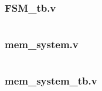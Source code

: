 \subsubsection*{FSM\_tb.v}
\inputminted{verilog}{../verilog_mem8x8_m_tri_state_buffer/FSM_tb.v}

\subsubsection*{mem\_system.v}
\inputminted{verilog}{../verilog_mem8x8_m_tri_state_buffer/mem_system.v}

\subsubsection*{mem\_system\_tb.v}
\inputminted{verilog}{../verilog_mem8x8_m_tri_state_buffer/mem_system_tb.v}

